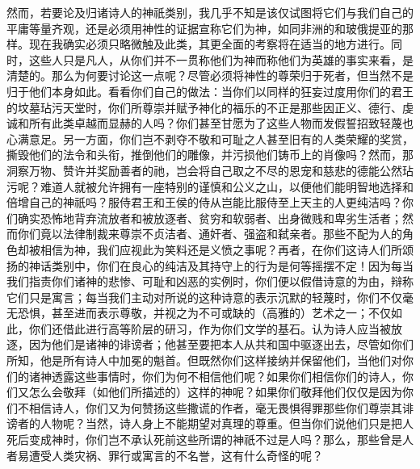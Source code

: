 然而，若要论及归诸诗人的神祇类别，我几乎不知是该仅试图将它们与我们自己的平庸等量齐观，还是必须用神性的证据宣称它们为神，如同非洲的和玻俄提亚的那样。\newline{}现在我确实必须只略微触及此类，其更全面的考察将在适当的地方进行。\newline{}同时，这些人只是凡人，从你们并不一贯称他们为神而称他们为英雄的事实来看，是清楚的。\newline{}那么为何要讨论这一点呢？尽管必须将神性的尊荣归于死者，但当然不是归于他们本身如此。\newline{}看看你们自己的做法：当你们以同样的狂妄过度用你们的君王的坟墓玷污天堂时，你们所尊崇并赋予神化的福乐的不正是那些因正义、德行、虔诚和所有此类卓越而显赫的人吗？你们甚至甘愿为了这些人物而发假誓招致轻蔑也心满意足。\newline{}另一方面，你们岂不剥夺不敬和可耻之人甚至旧有的人类荣耀的奖赏，撕毁他们的法令和头衔，推倒他们的雕像，并污损他们铸币上的肖像吗？\newline{}然而，那洞察万物、赞许并奖励善者的祂，岂会将自己取之不尽的恩宠和慈悲的德能公然玷污呢？\newline{}难道人就被允许拥有一座特别的谨慎和公义之山，以便他们能明智地选择和倍增自己的神祇吗？\newline{}服侍君王和王侯的侍从岂能比服侍至上天主的人更纯洁吗？\newline{}你们确实恐怖地背弃流放者和被放逐者、贫穷和软弱者、出身微贱和卑劣生活者；然而你们竟以法律制裁来尊崇不贞洁者、通奸者、强盗和弑亲者。\newline{}那些不配为人的角色却被相信为神，我们应视此为笑料还是义愤之事呢？\newline{}再者，在你们这诗人们所颂扬的神话类别中，你们在良心的纯洁及其持守上的行为是何等摇摆不定！\newline{}因为每当我们指责你们诸神的悲惨、可耻和凶恶的实例时，你们便以假借诗意的为由，辩称它们只是寓言；\newline{}每当我们主动对所说的这种诗意的表示沉默的轻蔑时，你们不仅毫无恐惧，甚至进而表示尊敬，并视之为不可或缺的（高雅的）艺术之一；不仅如此，你们还借此进行高等阶层的研习，作为你们文学的基石。\newline{}认为诗人应当被放逐，因为他们是诸神的诽谤者；他甚至要把本人从共和国中驱逐出去，尽管如你们所知，他是所有诗人中加冕的魁首。\newline{}但既然你们这样接纳并保留他们，当他们对你们的诸神透露这些事情时，你们为何不相信他们呢？\newline{}如果你们相信你们的诗人，你们又怎么会敬拜（如他们所描述的）这样的神呢？如果你们敬拜他们仅仅是因为你们不相信诗人，你们又为何赞扬这些撒谎的作者，毫无畏惧得罪那些你们尊崇其诽谤者的人物呢？\newline{}当然，诗人身上不能期望对真理的尊重。\newline{}但当你们说他们只是把人死后变成神时，你们岂不承认死前这些所谓的神祇不过是人吗？\newline{}那么，那些曾是人者易遭受人类灾祸、罪行或寓言的不名誉，这有什么奇怪的呢？\new
